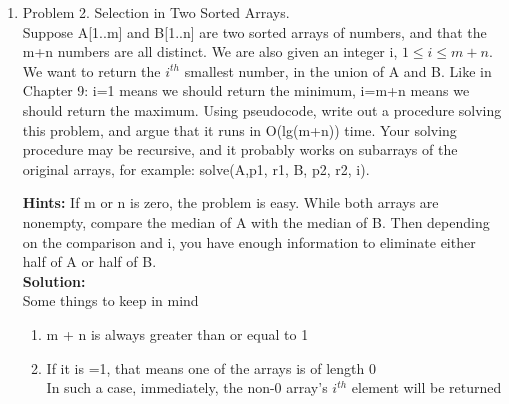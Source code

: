 \documentclass[11pt]{article}
\begin{document}
\begin{enumerate}
\begin{enumerate}
    \end{enumerate}
\pagebreak
\item Problem 2. Selection in Two Sorted Arrays.\\
Suppose A[1..m] and B[1..n] are two sorted arrays of numbers, and that the m+n numbers are all distinct. We are also given an integer i, $1 \leq i \leq m+n$. We want to return the $i^{th}$ smallest number, in the union of A and B. Like in Chapter 9: i=1 means we should return the minimum, i=m+n means we should return the maximum. Using pseudocode, write out a procedure solving this problem, and argue that it runs in O(lg(m+n)) time.  Your solving procedure may be recursive, and it probably works on subarrays of the original arrays, for example: solve(A,p1, r1, B, p2, r2, i).\vspace{0.1cm}

\textbf{Hints: }If m or n is zero, the problem is easy. While both arrays are nonempty, compare the median of A with the median of B. Then depending on the comparison and i, you have enough information to eliminate either half of A or half of B.\\

\textbf{Solution: }\\
Some things to keep in mind
\begin{enumerate}
    \item m + n is always greater than or equal to 1
    \item If it is =1, that means one of the arrays is of length 0\\
    In such a case, immediately, the non-0 array's $i^{th}$ element will be returned
\end{enumerate}


\end{enumerate}
\end{document}
